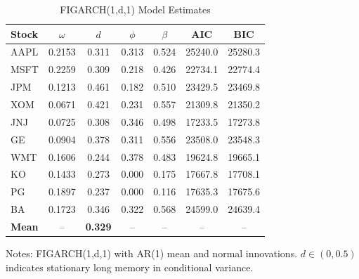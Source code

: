 
\begin{table}[htbp]
\centering
\caption{FIGARCH(1,d,1) Model Estimates}
\label{tab:figarch_estimates}
\small
\begin{tabular}{lcccccc}
\toprule
Stock & $\omega$ & $d$ & $\phi$ & $\beta$ & AIC & BIC \\
\midrule
AAPL & 0.2153 & 0.311 & 0.313 & 0.524 & 25240.0 & 25280.3 \\
MSFT & 0.2259 & 0.309 & 0.218 & 0.426 & 22734.1 & 22774.4 \\
JPM & 0.1213 & 0.461 & 0.182 & 0.510 & 23429.5 & 23469.8 \\
XOM & 0.0671 & 0.421 & 0.231 & 0.557 & 21309.8 & 21350.2 \\
JNJ & 0.0725 & 0.308 & 0.346 & 0.498 & 17233.5 & 17273.8 \\
GE & 0.0904 & 0.378 & 0.311 & 0.556 & 23508.0 & 23548.3 \\
WMT & 0.1606 & 0.244 & 0.378 & 0.483 & 19624.8 & 19665.1 \\
KO & 0.1433 & 0.273 & 0.000 & 0.175 & 17667.8 & 17708.1 \\
PG & 0.1897 & 0.237 & 0.000 & 0.116 & 17635.3 & 17675.6 \\
BA & 0.1723 & 0.346 & 0.322 & 0.568 & 24599.0 & 24639.4 \\
\midrule
\textbf{Mean} & -- & \textbf{0.329} & -- & -- & -- & -- \\
\bottomrule
\end{tabular}
\begin{tablenotes}\small
\item Notes: FIGARCH(1,d,1) with AR(1) mean and normal innovations. $d \in (0, 0.5)$ indicates stationary long memory in conditional variance.
\end{tablenotes}
\end{table}